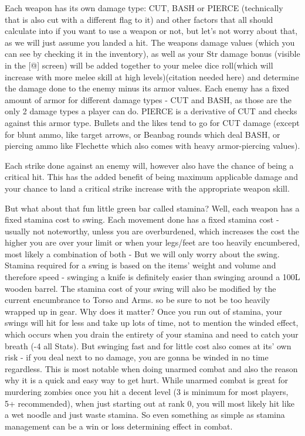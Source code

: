 Each weapon has its own damage type: CUT, BASH or PIERCE (technically that is also cut with a different flag to it) and other factors that all should calculate into if you want to use a weapon or not, but let's not worry about that, as we will just assume you landed a hit. The weapons damage values (which you can see by checking it in the inventory), as well as your Str damage bonus (visible in the [@] screen) will be added together to your melee dice roll(which will increase with more melee skill at high levels)(citation needed here) and determine the damage done to the enemy minus its armor values. Each enemy has a fixed amount of armor for different damage types - CUT and BASH, as those are the only 2 damage types a player can do. PIERCE is a derivative of CUT and checks against this armor type. Bullets and the likes tend to go for CUT damage (except for blunt ammo, like target arrows, or Beanbag rounds which deal BASH, or piercing ammo like Flechette which also comes with heavy armor-piercing values).

Each strike done against an enemy will, however also have the chance of being a critical hit. This has the added benefit of being maximum applicable damage and your chance to land a critical strike increase with the appropriate weapon skill.

But what about that fun little green bar called stamina? Well, each weapon has a fixed stamina cost to swing. Each movement done has a fixed stamina cost - usually not noteworthy, unless you are overburdened, which increases the cost the higher you are over your limit or when your legs/feet are too heavily encumbered, most likely a combination of both - But we will only worry about the swing. Stamina required for a swing is based on the items' weight and volume and therefore speed - swinging a knife is definitely easier than swinging around a 100L wooden barrel. The stamina cost of your swing will also be modified by the current encumbrance to Torso and Arms. so be sure to not be too heavily wrapped up in gear. Why does it matter? Once you run out of stamina, your swings will hit for less and take up lots of time, not to mention the winded effect, which occurs when you drain the entirety of your stamina and need to catch your breath (-4 all Stats). But swinging fast and for little cost also comes at its' own risk - if you deal next to no damage, you are gonna be winded in no time regardless. This is most notable when doing unarmed combat and also the reason why it is a quick and easy way to get hurt. While unarmed combat is great for murdering zombies once you hit a decent level (3 is minimum for most players, 5+ recommended), when just starting out at rank 0, you will most likely hit like a wet noodle and just waste stamina. So even something as simple as stamina management can be a win or loss determining effect in combat.

